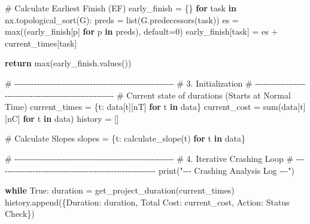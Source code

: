 \documentclass[
  letterpaper,
  DIV=11,
  numbers=noendperiod]{scrreprt}
\newenvironment{Shaded}{\begin{snugshade}}{\end{snugshade}}
\newcommand{\BuiltInTok}[1]{\textcolor[rgb]{0.00,0.23,0.31}{#1}}
\newcommand{\CommentTok}[1]{\textcolor[rgb]{0.37,0.37,0.37}{#1}}
\newcommand{\ControlFlowTok}[1]{\textcolor[rgb]{0.00,0.23,0.31}{\textbf{#1}}}
\newcommand{\DecValTok}[1]{\textcolor[rgb]{0.68,0.00,0.00}{#1}}
\newcommand{\KeywordTok}[1]{\textcolor[rgb]{0.00,0.23,0.31}{\textbf{#1}}}
\newcommand{\NormalTok}[1]{\textcolor[rgb]{0.00,0.23,0.31}{#1}}
\newcommand{\OperatorTok}[1]{\textcolor[rgb]{0.37,0.37,0.37}{#1}}
\newcommand{\StringTok}[1]{\textcolor[rgb]{0.13,0.47,0.30}{#1}}
\newcommand{\VariableTok}[1]{\textcolor[rgb]{0.07,0.07,0.07}{#1}}
\begin{document}
\begin{Shaded}
\begin{Highlighting}[]
    \CommentTok{\# Calculate Earliest Finish (EF)}
\NormalTok{    early\_finish }\OperatorTok{=}\NormalTok{ \{\}}
    \ControlFlowTok{for}\NormalTok{ task }\KeywordTok{in}\NormalTok{ nx.topological\_sort(G):}
\NormalTok{        preds }\OperatorTok{=} \BuiltInTok{list}\NormalTok{(G.predecessors(task))}
\NormalTok{        es }\OperatorTok{=} \BuiltInTok{max}\NormalTok{((early\_finish[p] }\ControlFlowTok{for}\NormalTok{ p }\KeywordTok{in}\NormalTok{ preds), default}\OperatorTok{=}\DecValTok{0}\NormalTok{)}
\NormalTok{        early\_finish[task] }\OperatorTok{=}\NormalTok{ es }\OperatorTok{+}\NormalTok{ current\_times[task]}
        
    \ControlFlowTok{return} \BuiltInTok{max}\NormalTok{(early\_finish.values())}

\CommentTok{\# {-}{-}{-}{-}{-}{-}{-}{-}{-}{-}{-}{-}{-}{-}{-}{-}{-}{-}{-}{-}{-}{-}{-}{-}{-}{-}{-}{-}{-}{-}{-}{-}{-}{-}{-}{-}{-}{-}{-}{-}{-}{-}{-}{-}{-}{-}{-}{-}{-}{-}{-}{-}{-}{-}{-}{-}{-}}
\CommentTok{\# 3. Initialization}
\CommentTok{\# {-}{-}{-}{-}{-}{-}{-}{-}{-}{-}{-}{-}{-}{-}{-}{-}{-}{-}{-}{-}{-}{-}{-}{-}{-}{-}{-}{-}{-}{-}{-}{-}{-}{-}{-}{-}{-}{-}{-}{-}{-}{-}{-}{-}{-}{-}{-}{-}{-}{-}{-}{-}{-}{-}{-}{-}{-}}
\CommentTok{\# Current state of durations (Starts at Normal Time)}
\NormalTok{current\_times }\OperatorTok{=}\NormalTok{ \{t: data[t][}\StringTok{\textquotesingle{}nT\textquotesingle{}}\NormalTok{] }\ControlFlowTok{for}\NormalTok{ t }\KeywordTok{in}\NormalTok{ data\}}
\NormalTok{current\_cost }\OperatorTok{=} \BuiltInTok{sum}\NormalTok{(data[t][}\StringTok{\textquotesingle{}nC\textquotesingle{}}\NormalTok{] }\ControlFlowTok{for}\NormalTok{ t }\KeywordTok{in}\NormalTok{ data)}
\NormalTok{history }\OperatorTok{=}\NormalTok{ []}

\CommentTok{\# Calculate Slopes}
\NormalTok{slopes }\OperatorTok{=}\NormalTok{ \{t: calculate\_slope(t) }\ControlFlowTok{for}\NormalTok{ t }\KeywordTok{in}\NormalTok{ data\}}

\CommentTok{\# {-}{-}{-}{-}{-}{-}{-}{-}{-}{-}{-}{-}{-}{-}{-}{-}{-}{-}{-}{-}{-}{-}{-}{-}{-}{-}{-}{-}{-}{-}{-}{-}{-}{-}{-}{-}{-}{-}{-}{-}{-}{-}{-}{-}{-}{-}{-}{-}{-}{-}{-}{-}{-}{-}{-}{-}{-}}
\CommentTok{\# 4. Iterative Crashing Loop}
\CommentTok{\# {-}{-}{-}{-}{-}{-}{-}{-}{-}{-}{-}{-}{-}{-}{-}{-}{-}{-}{-}{-}{-}{-}{-}{-}{-}{-}{-}{-}{-}{-}{-}{-}{-}{-}{-}{-}{-}{-}{-}{-}{-}{-}{-}{-}{-}{-}{-}{-}{-}{-}{-}{-}{-}{-}{-}{-}{-}}
\BuiltInTok{print}\NormalTok{(}\StringTok{"{-}{-}{-} Crashing Analysis Log {-}{-}{-}"}\NormalTok{)}

\ControlFlowTok{while} \VariableTok{True}\NormalTok{:}
\NormalTok{    duration }\OperatorTok{=}\NormalTok{ get\_project\_duration(current\_times)}
\NormalTok{    history.append(\{}\StringTok{\textquotesingle{}Duration\textquotesingle{}}\NormalTok{: duration, }\StringTok{\textquotesingle{}Total Cost\textquotesingle{}}\NormalTok{: current\_cost, }\StringTok{\textquotesingle{}Action\textquotesingle{}}\NormalTok{: }\StringTok{\textquotesingle{}Status Check\textquotesingle{}}\NormalTok{\})}
    

\end{Highlighting}
\end{Shaded}
\end{document}
